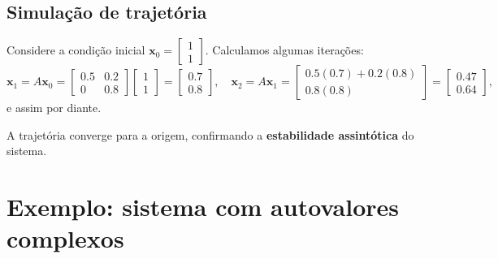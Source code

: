 \documentclass{article}
\begin{document}
\subsection*{Simulação de trajetória}

Considere a condição inicial
$\bm{x}_0 = \begin{bmatrix} 1 \\ 1 \end{bmatrix}$.  Calculamos algumas
iterações:
\[
\bm{x}_1 = A \bm{x}_0 = 
\begin{bmatrix}
0.5 & 0.2 \\
0   & 0.8
\end{bmatrix}
\begin{bmatrix}
1 \\
1
\end{bmatrix}
=
\begin{bmatrix}
0.7 \\
0.8
\end{bmatrix}, \quad
\bm{x}_2 = A \bm{x}_1 = 
\begin{bmatrix}
0.5(0.7) + 0.2(0.8) \\
0.8(0.8)
\end{bmatrix}
=
\begin{bmatrix}
0.47 \\
0.64
\end{bmatrix},
\]
e assim por diante.


\begin{center}
\end{center}

A trajetória converge para a origem, confirmando a \textbf{estabilidade assintótica} do sistema.

\section{Exemplo: sistema com autovalores complexos}
\end{document}
